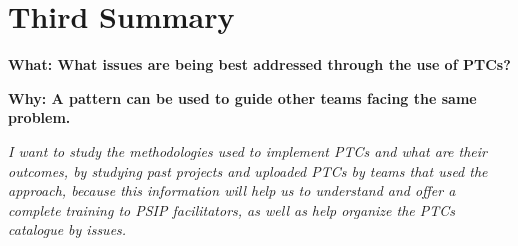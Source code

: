 \documentclass[a4paper]{article}
\begin{document}

\section{Third Summary}
\textbf {What: What issues are being best addressed through the use of PTCs?} \par
\textbf {Why: A pattern can be used to guide other teams facing the same problem.} \par
\textit{I want to study the methodologies used to implement PTCs and what are their outcomes, by studying past projects and uploaded PTCs by teams that used the approach, because this information will help us to understand and offer a complete training to PSIP facilitators, as well as help organize the PTCs catalogue by issues.}



\end{document}
